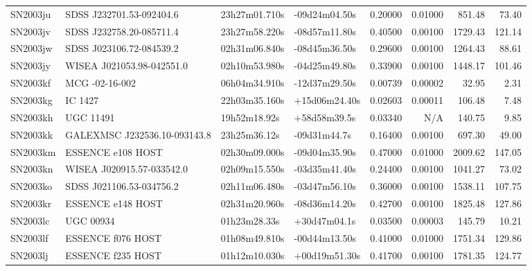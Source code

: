 \begin{longtable}{llllrrrr}
SN2003ju         &        SDSS J232701.53-092404.6 &   23h27m01.710s &   -09d24m04.50s &  0.20000 &  0.01000 &   851.48 &       73.40 \\
SN2003jv         &        SDSS J232758.20-085711.4 &   23h27m58.220s &   -08d57m11.80s &  0.40500 &  0.00100 &  1729.43 &      121.14 \\
SN2003jw         &        SDSS J023106.72-084539.2 &   02h31m06.840s &   -08d45m36.50s &  0.29600 &  0.00100 &  1264.43 &       88.61 \\
SN2003jy         &       WISEA J021053.98-042551.0 &   02h10m53.980s &   -04d25m49.80s &  0.33900 &  0.00100 &  1448.17 &      101.46 \\
SN2003kf         &                  MCG -02-16-002 &   06h04m34.910s &   -12d37m29.50s &  0.00739 &  0.00002 &    32.95 &        2.31 \\
SN2003kg         &                         IC 1427 &   22h03m35.160s &   +15d06m24.40s &  0.02603 &  0.00011 &   106.48 &        7.48 \\
SN2003kh         &                       UGC 11491 &    19h52m18.92s &    +58d58m39.5s &  0.03340 &      N/A &   140.75 &        9.85 \\
SN2003kk         &  GALEXMSC J232536.10-093143.8   &    23h25m36.12s &    -09d31m44.7s &  0.16400 &  0.00100 &   697.30 &       49.00 \\
SN2003km         &               ESSENCE e108 HOST &   02h30m09.000s &   -09d04m35.90s &  0.47000 &  0.01000 &  2009.62 &      147.05 \\
SN2003kn         &       WISEA J020915.57-033542.0 &   02h09m15.550s &   -03d35m41.40s &  0.24400 &  0.00100 &  1041.27 &       73.02 \\
SN2003ko         &        SDSS J021106.53-034756.2 &   02h11m06.480s &   -03d47m56.10s &  0.36000 &  0.00100 &  1538.11 &      107.75 \\
SN2003kr         &               ESSENCE e148 HOST &   02h31m20.960s &   -08d36m14.20s &  0.42700 &  0.00100 &  1825.48 &      127.86 \\
SN2003lc         &                       UGC 00934 &    01h23m28.33s &    +30d47m04.1s &  0.03500 &  0.00003 &   145.79 &       10.21 \\
SN2003lf         &               ESSENCE f076 HOST &   01h08m49.810s &   -00d44m13.50s &  0.41000 &  0.01000 &  1751.34 &      129.86 \\
SN2003lj         &               ESSENCE f235 HOST &   01h12m10.030s &   +00d19m51.30s &  0.41700 &  0.00100 &  1781.35 &      124.77 \\

\end{longtable}

